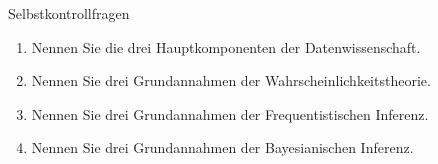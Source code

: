 \documentclass[
  8pt,
  ignorenonframetext,
]{beamer}
\providecommand{\tightlist}{%
  \setlength{\itemsep}{0pt}\setlength{\parskip}{0pt}}
\begin{document}
\begin{frame}{Selbstkontrollfragen}
\protect\hypertarget{selbstkontrollfragen}{}

\begin{enumerate}
\tightlist
\item
  Nennen Sie die drei Hauptkomponenten der Datenwissenschaft.
\item
  Nennen Sie drei Grundannahmen der Wahrscheinlichkeitstheorie.
\item
  Nennen Sie drei Grundannahmen der Frequentistischen Inferenz.
\item
  Nennen Sie drei Grundannahmen der Bayesianischen Inferenz.
\end{enumerate}
\end{frame}
\end{document}
